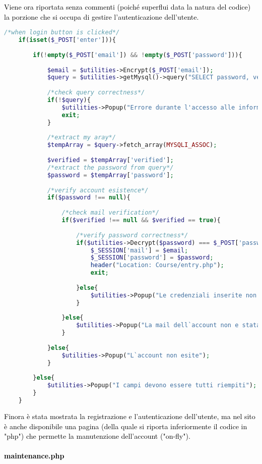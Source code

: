 \textcolor{black}{Viene ora riportata senza commenti (poiché superflui data la natura del codice) la porzione che si occupa di gestire l'autenticazione dell'utente.}\\ 

\begin{lstlisting}[language=php]
	/*when login button is clicked*/
	if(isset($_POST['enter'])){
		
		if(!empty($_POST['email']) && !empty($_POST['password'])){
			
			$email = $utilities->Encrypt($_POST['email']);
			$query = $utilities->getMysql()->query("SELECT password, verified FROM user_table1 WHERE (email = '{$email}')");
			
			/*check query correctness*/
			if(!$query){
				$utilities->Popup("Errore durante l'accesso alle informazioni");
				exit;
			}
			
			/*extract my aray*/
			$tempArray = $query->fetch_array(MYSQLI_ASSOC);
			
			$verified = $tempArray['verified'];
			/*extract the password from query*/
			$password = $tempArray['password'];
			
			/*verify account esistence*/  
			if($password !== null){
				
				/*check mail verification*/
				if($verified !== null && $verified == true){
					
					/*verify password correctness*/
					if($utilities->Decrypt($password) === $_POST['password']){
						$_SESSION['mail'] = $email;
						$_SESSION['password'] = $password;
						header("Location: Course/entry.php");
						exit;
						
					}else{
						$utilities->Popup("Le credenziali inserite non sono corrette");
					}
					
				}else{
					$utilities->Popup("La mail dell`account non e stata verificata.");
				}
				
			}else{
				$utilities->Popup("L`account non esite");
			}
			
		}else{
			$utilities->Popup("I campi devono essere tutti riempiti");
		}
	}
\end{lstlisting}

\textcolor{black}{Finora è stata mostrata la registrazione e l'autenticazione dell'utente, ma nel sito è anche disponibile una pagina (della quale si riporta inferiormente il codice in "php") che permette la manutenzione dell'account ("on-fly").}\\

\paragraph{\textcolor{black}{maintenance.php}}\leavevmode\\

